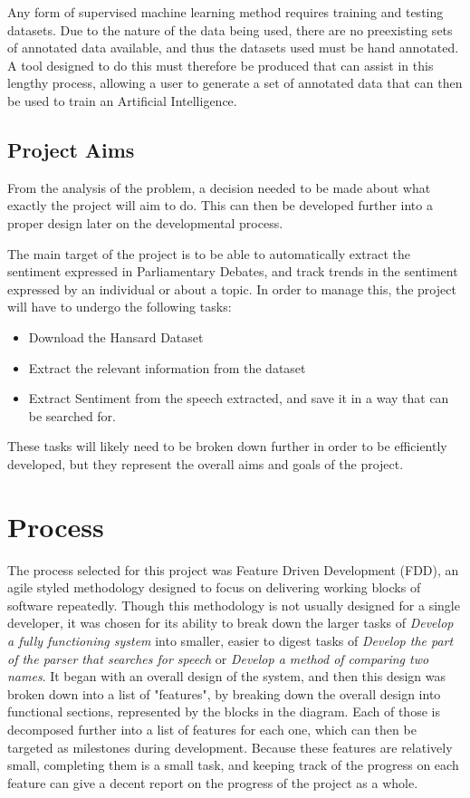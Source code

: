 Any form of supervised machine learning method requires training and testing datasets. Due to the nature of the data being used, there are no preexisting sets of annotated data available, and thus the datasets used must be hand annotated. A tool designed to do this must therefore be produced that can assist in this lengthy process, allowing a user to generate a set of annotated data that can then be used to train an Artificial Intelligence.

\subsection{Project Aims}
\label{sec:bck_project_aims}
From the analysis of the problem, a decision needed to be made about what exactly the project will aim to do. This can then be developed further into a proper design later on the developmental process.

The main target of the project is to be able to automatically extract the sentiment expressed in Parliamentary Debates, and track trends in the sentiment expressed by an individual or about a topic. In order to manage this, the project will have to undergo the following tasks:
\begin{itemize}
	\item Download the Hansard Dataset
	\item Extract the relevant information from the dataset
	\item Extract Sentiment from the speech extracted, and save it in a way that can be searched for.
\end{itemize}

These tasks will likely need to be broken down further in order to be efficiently developed, but they represent the overall aims and goals of the project.

\section{Process}
\label{sec:bck_process}
The process selected for this project was Feature Driven Development (FDD), an agile styled methodology designed to focus on delivering working blocks of software repeatedly. Though this methodology is not usually designed for a single developer, it was chosen for its ability to break down the larger tasks of \emph{Develop a fully functioning system} into smaller, easier to digest tasks of \emph{Develop the part of the parser that searches for speech} or \emph{Develop a method of comparing two names}. It began with an overall design of the system, and then this design was broken down into a list of "features", by breaking down the overall design into functional sections, represented by the blocks in the diagram. Each of those is decomposed further into a list of features for each one, which can then be targeted as milestones during development. Because these features are relatively  small, completing them is a small task, and keeping track of the progress on each feature can give a decent report on the progress of the project as a whole.

